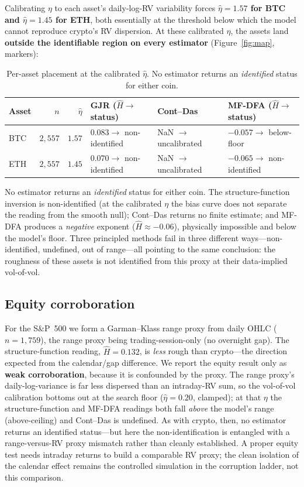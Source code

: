 \documentclass[11pt]{article}
\begin{document}
Calibrating $\eta$ to each asset's daily-log-RV variability forces
\textbf{$\hat\eta = 1.57$ for BTC and $\hat\eta = 1.45$ for ETH}, both essentially
at the threshold below which the model cannot reproduce crypto's RV dispersion. At
these calibrated $\eta$, the assets land \textbf{outside the identifiable region on
every estimator} (Figure~\ref{fig:map}, markers):

\begin{table}[t]
\centering
\setlength{\tabcolsep}{4pt}
\caption{Per-asset placement at the calibrated $\hat\eta$. No estimator returns an
\emph{identified} status for either coin.}
\label{tab:assets}
\begin{tabular}{lrrlll}
\toprule
Asset & $n$ & $\hat\eta$ & GJR ($\hat H \to$ status) & Cont--Das & MF-DFA ($\hat H \to$ status) \\
\midrule
BTC & $2{,}557$ & $1.57$ & $0.083 \to$ non-identified & NaN $\to$ uncalibrated & $-0.057 \to$ below-floor \\
ETH & $2{,}557$ & $1.45$ & $0.070 \to$ non-identified & NaN $\to$ uncalibrated & $-0.065 \to$ non-identified \\
\bottomrule
\end{tabular}
\end{table}

No estimator returns an \emph{identified} status for either coin. The
structure-function inversion is non-identified (at the calibrated $\eta$ the bias
curve does not separate the reading from the smooth null); Cont--Das returns no
finite estimate; and MF-DFA produces a \emph{negative} exponent
($\hat H \approx -0.06$), physically impossible and below the model's floor. Three
principled methods fail in three different ways---non-identified, undefined, out of
range---all pointing to the same conclusion: the roughness of these assets is not
identified from this proxy at their data-implied vol-of-vol.

\subsection{Equity corroboration}
\label{sec:equity}

For the S\&P~500 we form a Garman--Klass range proxy from daily OHLC ($n = 1{,}759$),
the range proxy being trading-session-only (no overnight gap). The structure-function
reading, $\hat H = 0.132$, is \emph{less} rough than crypto---the direction expected
from the calendar/gap difference. We report the equity result only as \textbf{weak
corroboration}, because it is confounded by the proxy. The range proxy's
daily-log-variance is far less dispersed than an intraday-RV sum, so the vol-of-vol
calibration bottoms out at the search floor ($\hat\eta = 0.20$, clamped); at that
$\eta$ the structure-function and MF-DFA readings both fall \emph{above} the model's
range (above-ceiling) and Cont--Das is undefined. As with crypto, then, no estimator
returns an identified status---but here the non-identification is entangled with a
range-versus-RV proxy mismatch rather than cleanly established. A proper equity test
needs intraday returns to build a comparable RV proxy; the clean isolation of the
calendar effect remains the controlled simulation in the corruption ladder, not this
comparison.
\end{document}
